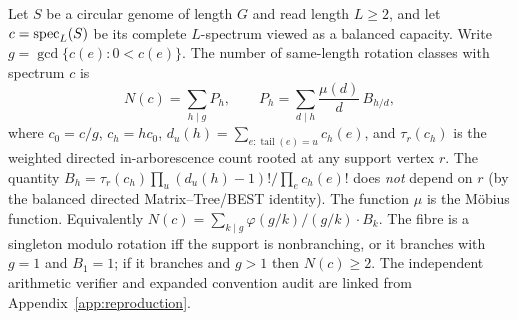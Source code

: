 \begin{theorem}
\label{thm:fibre-count}
Let $S$ be a circular genome of length $G$ and read length $L\ge2$, and let
$c=\operatorname{spec}_L(S)$ be its complete $L$-spectrum viewed as a balanced capacity.
Write $g=\gcd\{c(e):0<c(e)\}$. The number of same-length rotation classes
with spectrum $c$ is
\[
  N(c)=\sum_{h\mid g}P_h,\qquad
  P_h=\sum_{d\mid h}\frac{\mu(d)}{d}\,B_{h/d},
\]
where $c_0=c/g$, $c_h=h c_0$,
$d_u(h)=\sum_{e:\operatorname{tail}(e)=u}c_h(e)$,
and $\tau_r(c_h)$ is the weighted directed in-arborescence count
rooted at any support vertex $r$. The quantity
$B_h=\tau_r(c_h)\prod_u(d_u(h)-1)!/\prod_e c_h(e)!$
does \emph{not} depend on $r$ (by the balanced directed
Matrix--Tree/BEST identity). The function $\mu$ is the M\"obius
function. Equivalently $N(c)=\sum_{k\mid g}\varphi(g/k)/(g/k)\cdot B_k$.
The fibre is a singleton modulo rotation iff the support is nonbranching,
or it branches with $g=1$ and $B_1=1$; if it branches and $g>1$ then
$N(c)\ge2$. The independent arithmetic verifier and expanded convention audit
are linked from Appendix~\ref{app:reproduction}.
\end{theorem}

